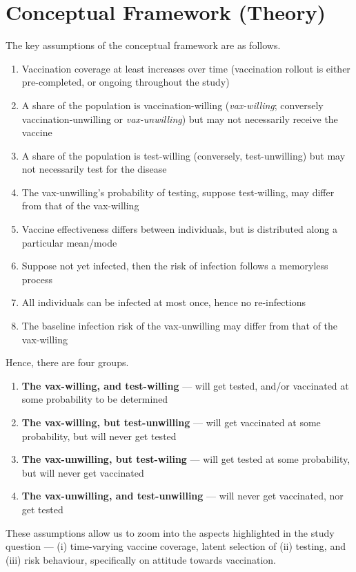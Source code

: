 \documentclass[12pt]{article}
\begin{document}
\section{Conceptual Framework (Theory)}
The key assumptions of the conceptual framework are as follows.
\begin{enumerate}
	\item Vaccination coverage at least increases over time (vaccination rollout is either pre-completed, or ongoing throughout the study)
	\item A share of the population is vaccination-willing (\textit{vax-willing}; conversely vaccination-unwilling or \textit{vax-unwilling}) but may not necessarily receive the vaccine
	\item A share of the population is test-willing (conversely, test-unwilling) but may not necessarily test for the disease
	\item The vax-unwilling's probability of testing, suppose test-willing, may differ from that of the vax-willing
	\item Vaccine effectiveness differs between individuals, but is distributed along a particular mean/mode
	\item Suppose not yet infected, then the risk of infection follows a memoryless process
	\item All individuals can be infected at most once, hence no re-infections
	\item The baseline infection risk of the vax-unwilling may differ from that of the vax-willing
\end{enumerate}

Hence, there are four groups.
\begin{enumerate}
	\item \textbf{The vax-willing, and test-willing} --- will get tested, and/or vaccinated at some probability to be determined
	\item \textbf{The vax-willing, but test-unwilling} --- will get vaccinated at some probability, but will never get tested
	\item \textbf{The vax-unwilling, but test-wiling} --- will get tested at some probability, but will never get vaccinated
	\item \textbf{The vax-unwilling, and test-unwilling} --- will never get vaccinated, nor get tested
\end{enumerate}

These assumptions allow us to zoom into the aspects highlighted in the study question --- (i) time-varying vaccine coverage, latent selection of (ii) testing, and (iii) risk behaviour, specifically on attitude towards vaccination.
\end{document}
